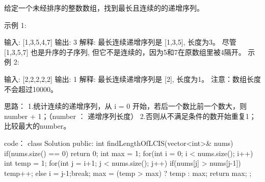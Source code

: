 给定一个未经排序的整数数组，找到最长且连续的的递增序列。

示例 1:

输入: [1,3,5,4,7]
输出: 3
解释: 最长连续递增序列是 [1,3,5], 长度为3。
尽管 [1,3,5,7] 也是升序的子序列, 但它不是连续的，因为5和7在原数组里被4隔开。 
示例 2:

输入: [2,2,2,2,2]
输出: 1
解释: 最长连续递增序列是 [2], 长度为1。
注意：数组长度不会超过10000。



























思路：
1.统计连续的递增序列，从 i = 0 开始，若后一个数比前一个数大，则 number + 1；（number ： 递增序列长度）
2.否则从不满足条件的数开始重复1；
比较最大的number。

























code：
class Solution {
public:
    int findLengthOfLCIS(vector<int>& nums) {
        if(nums.size() == 0) return 0;
        int max = 1;
        for(int i = 0; i < nums.size(); i++)
        {
            int temp = 1;
            for(int j = i+1; j < nums.size(); j++)
            {
                if(nums[j] > nums[j-1])
                    temp++;
                else
                {
                    i = j-1;break;
                }
            }
            max = (temp > max) ? temp : max;
        }
        return max;
    }
};